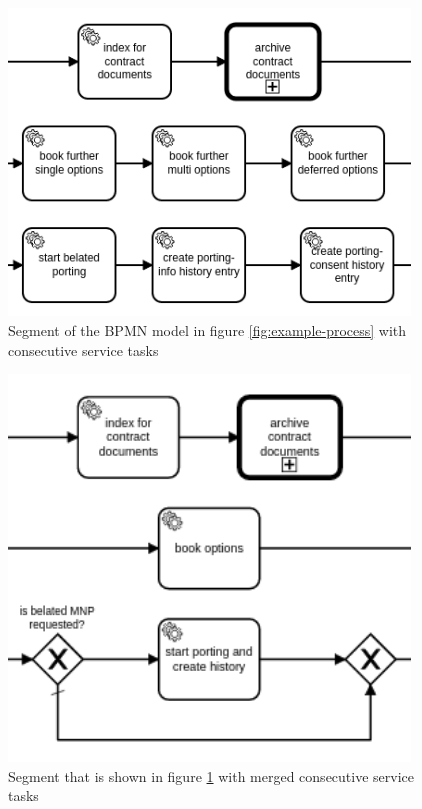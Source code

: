\begin{minipage}[t]{0.5\textwidth}
\begin{figure}[H]
	\centering
	\includegraphics[width=0.95\textwidth]{graphics/case-study-merge-org-2}
	\caption{Segment of the BPMN model in figure \ref{fig:example-process} with consecutive service tasks}
	\label{fig:merge-2-org}
\end{figure}
\end{minipage}
\begin{minipage}[t]{0.5\textwidth}
\begin{figure}[H]
	\centering
	\includegraphics[width=0.95\textwidth]{graphics/case-study-merge-new-2}
	\caption{Segment that is shown in figure \ref{fig:merge-2-org} with merged consecutive service tasks}
	\label{fig:merge-2-new}
\end{figure}
\end{minipage}

